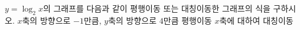 $y=\log_2 x$의 그래프를 다음과 같이 평행이동 또는 대칭이동한 그래프의 식을 구하시오.
 $x$축의 방향으로 $-1$만큼, $y$축의 방향으로 $4$만큼 평행이동
 $x$축에 대하여 대칭이동
